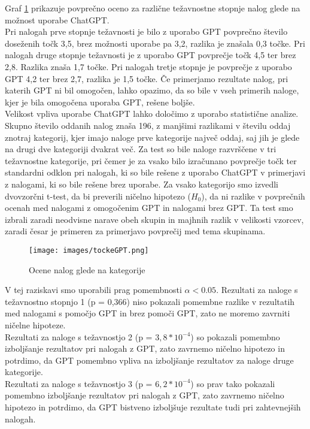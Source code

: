 \documentclass[a4paper,12pt,openright]{book}
\begin{document}
Graf \ref{fig:bar_all} prikazuje povprečno oceno za različne težavnostne stopnje nalog glede na možnost uporabe ChatGPT. \\
Pri nalogah prve stopnje težavnosti je bilo z uporabo GPT povprečno število doseženih točk 3,5, brez možnosti uporabe pa 3,2, razlika je znašala 0,3 točke. Pri nalogah druge stopnje težavnosti je z uporabo GPT povprečje točk 4,5 ter brez 2,8. Razlika znaša 1,7 točke. Pri nalogah tretje stopnje je povprečje z uporabo GPT 4,2 ter brez 2,7, razlika je 1,5 točke. Če primerjamo rezultate nalog, pri katerih GPT ni bil omogočen, lahko opazimo, da so bile v vseh primerih naloge, kjer je bila omogočena uporaba GPT, rešene boljše. \\
Velikost vpliva uporabe ChatGPT lahko določimo z uporabo statistične analize.
Skupno število oddanih nalog znaša 196, z manjšimi razlikami v številu oddaj znotraj kategorij, kjer imajo naloge prve kategorije največ oddaj, saj jih je glede na drugi dve kategoriji dvakrat več. Za test so bile naloge razvrščene v tri težavnostne kategorije, pri čemer je za vsako bilo izračunano povprečje točk ter standardni odklon pri nalogah, ki so bile rešene z uporabo ChatGPT v primerjavi z nalogami, ki so bile rešene brez uporabe. Za vsako kategorijo smo izvedli dvovzorčni t-test, da bi preverili ničelno hipotezo ($H_0$), da ni razlike v povprečnih ocenah med nalogami z omogočenim GPT in nalogami brez GPT. Ta test smo izbrali zaradi neodvisne narave obeh skupin in majhnih razlik v velikosti vzorcev, zaradi česar je primeren za primerjavo povprečij med tema skupinama. 

\begin{figure}[H]
    \centering
    \texttt{[image: images/tockeGPT.png]}
    \caption{Ocene nalog glede na kategorije}
    \label{fig:bar_all}
\end{figure}
V tej raziskavi smo uporabili prag pomembnosti $\alpha < 0.05$.
 Rezultati za naloge s težavnostno stopnjo 1 (p = 0,366) niso pokazali pomembne razlike v rezultatih med nalogami s pomočjo GPT in brez pomoči GPT, zato ne moremo zavrniti ničelne hipoteze. \\
 Rezultati za naloge s težavnostjo 2 (p = $3,8 * 10^{-4}$) so pokazali pomembno izboljšanje rezultatov pri nalogah z GPT, zato zavrnemo ničelno hipotezo in potrdimo, da GPT pomembno vpliva na izboljšanje rezultatov za naloge druge kategorije. \\
 Rezultati za naloge s težavnostjo 3 (p = $6,2 * 10^{-4}$) so prav tako pokazali pomembno izboljšanje rezultatov pri nalogah z GPT, zato zavrnemo ničelno hipotezo in potrdimo, da GPT bistveno izboljšuje rezultate tudi pri zahtevnejših nalogah.\\
\end{document}
